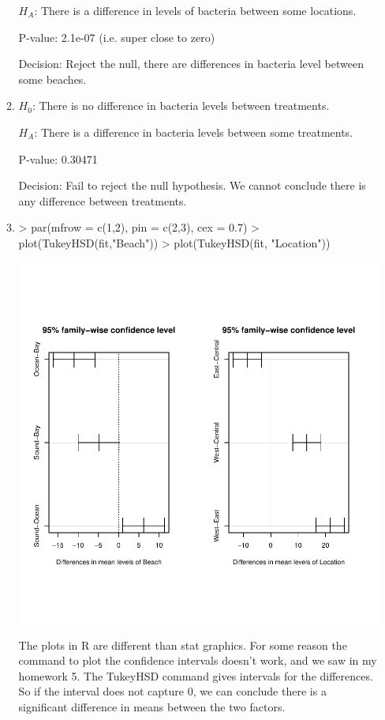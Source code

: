 \documentclass{article}
\begin{document}
\begin{enumerate}
\begin{enumerate}
$H_A$: There is a difference in levels of bacteria between some locations.

P-value: 2.1e-07 (i.e. super close to zero)

Decision: Reject the null, there are differences in bacteria level between some beaches.

\item

$H_0$: There is no difference in bacteria levels between treatments.

$H_A$: There is a difference in bacteria levels between some treatments.

P-value: 0.30471

Decision: Fail to reject the null hypothesis. We cannot conclude there is any difference between treatments.

\item

\begin{Schunk}
\begin{Sinput}
> par(mfrow = c(1,2), pin = c(2,3), cex = 0.7)
> plot(TukeyHSD(fit,"Beach"))
> plot(TukeyHSD(fit, "Location"))
\end{Sinput}
\end{Schunk}
\includegraphics{Homework6-003}

The plots in R are different than stat graphics. For some reason the command to plot the confidence intervals doesn't work, and we saw in my homework 5. The TukeyHSD command gives intervals for the differences. So if the interval does not capture 0, we can conclude there is a significant difference in means between the two factors. 


\end{enumerate}
\end{enumerate}
\end{document}
